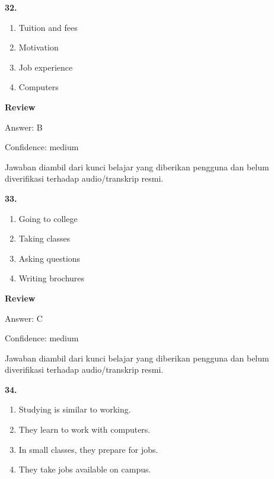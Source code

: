 \documentclass[12pt]{article}
\begin{document}
\noindent\textbf{32.}
\begin{enumerate}[label=(\Alph*),leftmargin=*,itemsep=0.2em]
\item Tuition and fees
\item Motivation
\item Job experience
\item Computers
\end{enumerate}
\par
\begingroup
\setlength{\parskip}{0pt}
\setlength{\parindent}{0pt}
\textbf{Review}\par
Answer: B\par
Confidence: medium\par
Jawaban diambil dari kunci belajar yang diberikan pengguna dan belum diverifikasi terhadap audio/transkrip resmi.\par
\endgroup
\par
\vspace{0.25\baselineskip}
\noindent\textbf{33.}
\begin{enumerate}[label=(\Alph*),leftmargin=*,itemsep=0.2em]
\item Going to college
\item Taking classes
\item Asking questions
\item Writing brochures
\end{enumerate}
\par
\begingroup
\setlength{\parskip}{0pt}
\setlength{\parindent}{0pt}
\textbf{Review}\par
Answer: C\par
Confidence: medium\par
Jawaban diambil dari kunci belajar yang diberikan pengguna dan belum diverifikasi terhadap audio/transkrip resmi.\par
\endgroup
\par
\vspace{0.25\baselineskip}
\noindent\textbf{34.}
\begin{enumerate}[label=(\Alph*),leftmargin=*,itemsep=0.2em]
\item Studying is similar to working.
\item They learn to work with computers.
\item In small classes, they prepare for jobs.
\item They take jobs available on campus.
\end{enumerate}
\par
\begingroup
\setlength{\parskip}{0pt}
\setlength{\parindent}{0pt}
\end{document}
